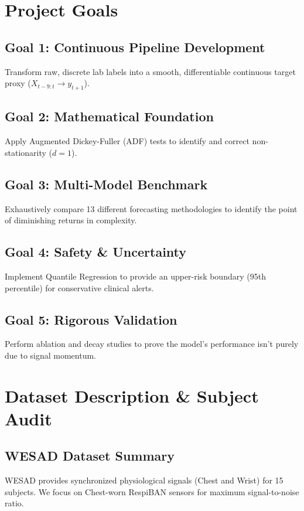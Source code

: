 \documentclass[12pt,a4paper,oneside]{report}
\begin{document}
\chapter{Project Goals}
\section{Goal 1: Continuous Pipeline Development}
Transform raw, discrete lab labels into a smooth, differentiable continuous target proxy ($X_{t-9:t} \rightarrow y_{t+1}$).
\section{Goal 2: Mathematical Foundation}
Apply Augmented Dickey-Fuller (ADF) tests to identify and correct non-stationarity ($d=1$).
\section{Goal 3: Multi-Model Benchmark}
Exhaustively compare 13 different forecasting methodologies to identify the point of diminishing returns in complexity.
\section{Goal 4: Safety & Uncertainty}
Implement Quantile Regression to provide an upper-risk boundary (95th percentile) for conservative clinical alerts.
\section{Goal 5: Rigorous Validation}
Perform ablation and decay studies to prove the model's performance isn't purely due to signal momentum.

\chapter{Dataset Description \& Subject Audit}
\section{WESAD Dataset Summary}
WESAD provides synchronized physiological signals (Chest and Wrist) for 15 subjects. We focus on Chest-worn RespiBAN sensors for maximum signal-to-noise ratio.
\end{document}
